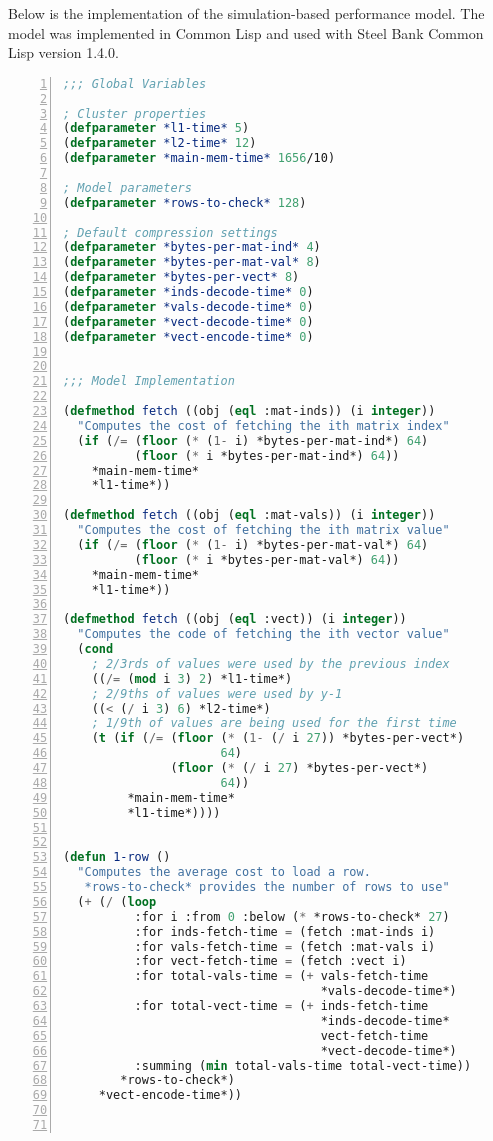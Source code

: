Below is the implementation of the simulation-based performance model.
The model was implemented in Common Lisp and used with Steel Bank Common Lisp version 1.4.0.

\begin{lstlisting}[language=Lisp,
					showstringspaces=false,
					numbers=left,
					numberstyle=\tiny]
;;; Global Variables

; Cluster properties
(defparameter *l1-time* 5)
(defparameter *l2-time* 12)
(defparameter *main-mem-time* 1656/10)

; Model parameters
(defparameter *rows-to-check* 128)

; Default compression settings
(defparameter *bytes-per-mat-ind* 4)
(defparameter *bytes-per-mat-val* 8)
(defparameter *bytes-per-vect* 8)
(defparameter *inds-decode-time* 0)
(defparameter *vals-decode-time* 0)
(defparameter *vect-decode-time* 0)
(defparameter *vect-encode-time* 0)


;;; Model Implementation

(defmethod fetch ((obj (eql :mat-inds)) (i integer))
  "Computes the cost of fetching the ith matrix index"
  (if (/= (floor (* (1- i) *bytes-per-mat-ind*) 64)
          (floor (* i *bytes-per-mat-ind*) 64))
    *main-mem-time*
    *l1-time*))

(defmethod fetch ((obj (eql :mat-vals)) (i integer))
  "Computes the cost of fetching the ith matrix value"
  (if (/= (floor (* (1- i) *bytes-per-mat-val*) 64)
          (floor (* i *bytes-per-mat-val*) 64))
    *main-mem-time*
    *l1-time*))

(defmethod fetch ((obj (eql :vect)) (i integer))
  "Computes the code of fetching the ith vector value"
  (cond
    ; 2/3rds of values were used by the previous index
    ((/= (mod i 3) 2) *l1-time*)
    ; 2/9ths of values were used by y-1
    ((< (/ i 3) 6) *l2-time*)
    ; 1/9th of values are being used for the first time
    (t (if (/= (floor (* (1- (/ i 27)) *bytes-per-vect*)
                      64)
               (floor (* (/ i 27) *bytes-per-vect*)
                      64))
         *main-mem-time*
         *l1-time*))))


(defun 1-row ()
  "Computes the average cost to load a row.
   *rows-to-check* provides the number of rows to use"
  (+ (/ (loop
          :for i :from 0 :below (* *rows-to-check* 27)
          :for inds-fetch-time = (fetch :mat-inds i)
          :for vals-fetch-time = (fetch :mat-vals i)
          :for vect-fetch-time = (fetch :vect i)
          :for total-vals-time = (+ vals-fetch-time
                                    *vals-decode-time*)
          :for total-vect-time = (+ inds-fetch-time
                                    *inds-decode-time*
                                    vect-fetch-time
                                    *vect-decode-time*)
          :summing (min total-vals-time total-vect-time))
        *rows-to-check*)
     *vect-encode-time*))



\end{lstlisting}
